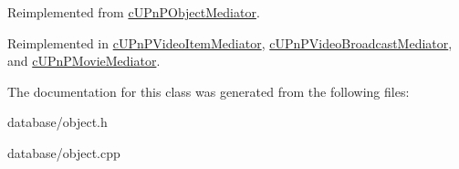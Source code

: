 Reimplemented from \hyperlink{classcUPnPObjectMediator_c44c010895f92adc63af2a2d34cf34c8}{cUPnPObjectMediator}.

Reimplemented in \hyperlink{classcUPnPVideoItemMediator_984e10738bca46ce38307d5f60e26bd3}{cUPnPVideoItemMediator}, \hyperlink{classcUPnPVideoBroadcastMediator_822f9c93928a7dbe9491c8cccbf53f95}{cUPnPVideoBroadcastMediator}, and \hyperlink{classcUPnPMovieMediator_61ab6dcaf2417898428ddf1f635788b7}{cUPnPMovieMediator}.

The documentation for this class was generated from the following files:\begin{CompactItemize}
\item 
database/object.h\item 
database/object.cpp\end{CompactItemize}
